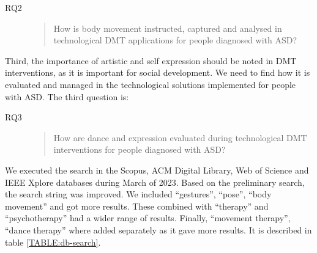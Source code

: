 \documentclass[a4paper,fleqn]{cas-sc}
\begin{document}
\begin{description}
  \item[RQ2] \begin{quote} How is body movement instructed, captured and analysed in technological DMT applications for people diagnosed with ASD? \end{quote}
\end{description}


Third, the importance of artistic and self expression should be noted in DMT interventions, as it is important for social development. We need to find how it is evaluated and managed in the technological solutions implemented for people with ASD. The third question is:

\begin{description}
  \item[RQ3] \begin{quote} How are dance and expression evaluated during technological DMT interventions for people diagnosed with ASD? \end{quote}
\end{description}

We executed the search in the Scopus, ACM Digital Library, Web of Science and IEEE Xplore databases during March of 2023. Based on the preliminary search, the search string was improved. We included ``gestures'', ``pose'', ``body movement'' and got more results. These combined with ``therapy'' and ``psychotherapy'' had a wider range of results. Finally, ``movement therapy'', ``dance therapy'' where added separately as it gave more results. It is described in table \ref{TABLE:db-search}.
\end{document}
